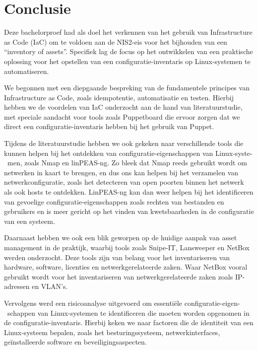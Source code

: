 
\chapter{Conclusie}%
\label{ch:conclusie}

Deze bachelorproef had als doel het verkennen van het gebruik van Infrastructure as Code (IaC) om te voldoen aan de NIS2-eis voor het bijhouden van een ``inventory of assets''.
Specifiek lag de focus op het ontwikkelen van een praktische oplossing voor het opstellen van een configuratie-inventaris op Linux-systemen te automatiseren.

We begonnen met een diepgaande bespreking van de fundamentele principes van Infrastructure as Code, zoals idempotentie, automatisatie en testen.
Hierbij hebben we de voordelen van IaC onderzocht aan de hand van literatuurstudie, met speciale aandacht voor tools zoals Puppetboard die ervoor zorgen dat we direct een configuratie-inventaris hebben bij het gebruik van Puppet.

Tijdens de literatuurstudie hebben we ook gekeken naar verschillende tools die kunnen helpen bij het ontdekken van configuratie-eigenschappen van Linux-syste-\ men, zoals Nmap en linPEAS-ng.
Zo bleek dat Nmap reeds gebruikt wordt om netwerken in kaart te brengen, en dus ons kan helpen bij het verzamelen van netwerkconfiguratie, zoals het detecteren van open poorten binnen het netwerk als ook hosts te ontdekken.
LinPEAS-ng kan dan weer helpen bij het identificeren van gevoelige configuratie-eigenschappen zoals rechten van bestanden en gebruikers en is meer gericht op het vinden van kwetsbaarheden in de configuratie van een systeem.

Daarnaast hebben we ook een blik geworpen op de huidige aanpak van asset management in de praktijk, waarbij tools zoals Snipe-IT, Lansweeper en NetBox werden onderzocht.
Deze tools zijn van belang voor het inventariseren van hardware, software, licenties en netwerkgerelateerde zaken.
Waar NetBox vooral gebruikt wordt voor het inventariseren van netwerkgerelateerde zaken zoals IP-adressen en VLAN's.

Vervolgens werd een risicoanalyse uitgevoerd om essenti\"ele configuratie-eigen-\ schappen van Linux-systemen te identificeren die moeten worden opgenomen in de configuratie-inventaris.
Hierbij keken we naar factoren die de identiteit van een Linux-systeem bepalen, zoals het besturingssysteem, netwerkinterfaces, ge\"installeerde software en beveiligingsaspecten.

